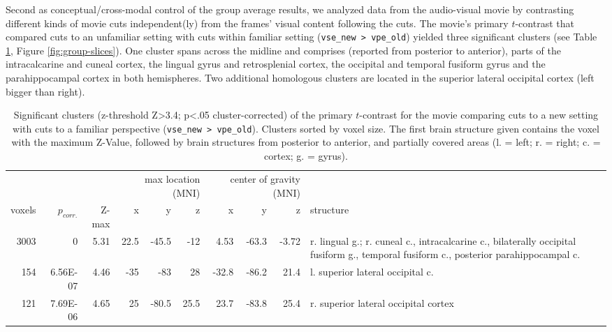\documentclass[english]{article}
\begin{document}
Second as conceptual/cross-modal control of the group average results, we
analyzed data from the audio-visual movie by contrasting different kinds of
movie cuts independent(ly) from the frames' visual content following the cuts.
The movie's primary $t$-contrast that compared cuts to an unfamiliar setting
with cuts within familiar setting (\texttt{vse\_new > vpe\_old}) yielded three
significant clusters (see Table \ref{tab:res-av-group1}, Figure
\ref{fig:group-slices}).
One cluster spans across the midline and comprises (reported from posterior to
anterior), parts of the intracalcarine and cuneal cortex, the lingual gyrus and
retrosplenial cortex, the occipital and temporal fusiform gyrus and the
parahippocampal cortex in both hemispheres.
Two additional homologous clusters are located in the superior lateral occipital
cortex (left bigger than right).


\begin{table}[t]
    \caption{Significant clusters (z-threshold Z>3.4; p<.05 cluster-corrected)
        of the primary $t$-contrast for the movie comparing cuts to a new
        setting with cuts to a familiar perspective (\texttt{vse\_new >
        vpe\_old}).
Clusters sorted by voxel size.
The first brain structure given contains the voxel with the maximum Z-Value,
followed by brain structures from posterior to anterior, and partially covered
areas (l. = left; r. = right; c. = cortex; g. = gyrus).}
\label{tab:res-av-group1}
\begin{tabular}{rrrrrrrrrp{3cm}}
\toprule
& & & \multicolumn{3}{r}{max location (MNI)} & \multicolumn{3}{r}{center of gravity (MNI)} &
\\ \cmidrule{4-6} \cmidrule{7-9}
voxels & $p_{corr.}$ & Z-max & x & y & z  & x & y & z & structure \\
\midrule
3003 & 0 & 5.31 & 22.5 & -45.5 & -12 & 4.53 & -63.3 & -3.72 & r. lingual g.; r. cuneal c., intracalcarine c., bilaterally occipital fusiform g., temporal fusiform c., posterior parahippocampal c.  \\
154 & 6.56E-07 & 4.46 & -35 & -83 & 28 & -32.8 & -86.2 & 21.4 & l. superior lateral occipital c. \\
121 & 7.69E-06 & 4.65 & 25 & -80.5 & 25.5 & 23.7 & -83.8 & 25.4 & r. superior lateral occipital cortex \\
\bottomrule
\end{tabular}
\end{table}
\end{document}
